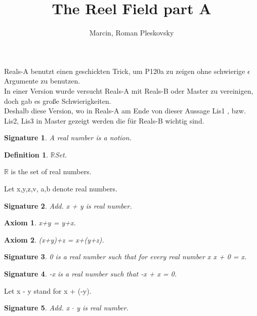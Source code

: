 \documentclass{article}
\newenvironment{forthel}{\begin{leftbar}}{\end{leftbar}}
\newtheorem{axiom}{Axiom}
\newtheorem{definition}{Definition}
\newtheorem{signature}{Signature}
\begin{document}
\title{The Reel Field part A}
\author{Marcin, Roman Pleskovsky}
\maketitle

Reals-A benutzt einen geschickten Trick, um P120a zu zeigen ohne schwierige $\epsilon$ Argumente zu benutzen.\\
In einer Version wurde versucht Reals-A mit Reals-B oder Master zu vereinigen, doch gab es gro\ss e Schwierigkeiten.\\
Deshalb diese Version, wo in Reals-A am Ende von dieser Aussage Lis1 , bzw. Lis2, Lis3 in Master gezeigt werden die f\"ur Reals-B wichtig sind.\\ 

\begin{forthel}
[set/-s] [element/-s] [number/-s]

\begin{signature} A real number is a notion.

\end{signature}

\begin{definition} $\mathbb{R}$Set.

\end{definition}
$\mathbb{R}$ is the set of real numbers.

Let x,y,z,v, a,b denote real numbers.



\begin{signature} Add. x + y is real number.

\end{signature}
\begin{axiom} x+y = y+x.

\end{axiom}
\begin{axiom} (x+y)+z = x+(y+z).

\end{axiom}
\begin{signature} 0 is a real number such that for every real number x x + 0 = x.

\end{signature}
\begin{signature} -x is a real number such that -x + x = 0.

\end{signature}

Let x - y stand for x + (-y).

\begin{signature} Add. x $\cdot$ y is real number.


\end{signature}
\end{forthel}
\end{document}
